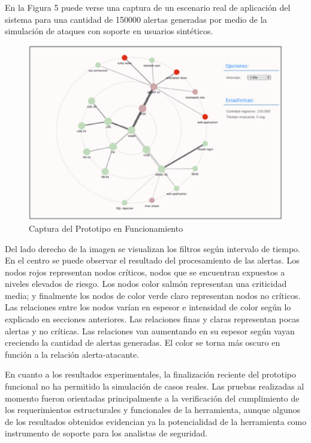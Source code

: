 \documentclass[a4paper]{./plantillas/llncs}
\begin{document}
En la Figura 5 puede verse una captura de un escenario real de aplicación del sistema para una cantidad de 150000 alertas generadas por medio de la simulación de ataques con soporte en usuarios sintéticos.

\begin{figure}
\centering
\includegraphics[scale=0.46]{./img/1-mp4}
\caption{Captura del Prototipo en Funcionamiento}
\end{figure}


Del lado derecho de la imagen se visualizan los filtros según intervalo de tiempo. En el centro se puede observar el resultado del procesamiento de las alertas. Los nodos rojos representan nodos críticos, nodos que se encuentran expuestos a niveles elevados de riesgo. Los nodos color salmón representan una criticidad media; y finalmente los nodos de color verde claro representan nodos no críticos. Las relaciones entre los nodos varían en espesor e intensidad de color según lo explicado en secciones anteriores. Las relaciones finas y claras representan pocas alertas y no críticas. Las relaciones van aumentando en su espesor según vayan creciendo la cantidad de alertas generadas. El color se torna más oscuro en función a la relación alerta-atacante. \newline 

En cuanto a los resultados experimentales, la finalización reciente del prototipo funcional no ha permitido la simulación de casos reales. Las pruebas realizadas al momento fueron orientadas principalmente a la verificación del cumplimiento de los requerimientos estructurales y funcionales de la herramienta, aunque algunos de los resultados obtenidos evidencian ya la potencialidad de la herramienta como instrumento de soporte para los analistas de seguridad. 
\end{document}
